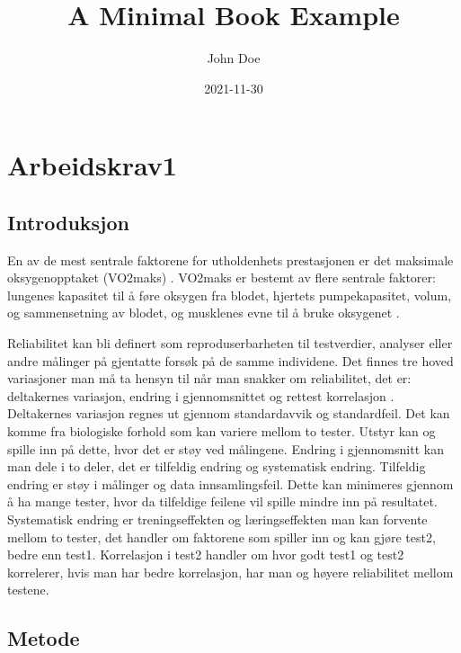 \documentclass[
]{book}
\title{A Minimal Book Example}
\author{John Doe}
\date{2021-11-30}
\begin{document}
\maketitle

{
\setcounter{tocdepth}{1}
\tableofcontents
}
\hypertarget{arbeidskrav1}{%
\chapter{Arbeidskrav1}\label{arbeidskrav1}}

\hypertarget{introduksjon}{%
\section{Introduksjon}\label{introduksjon}}

En av de mest sentrale faktorene for utholdenhets prestasjonen er det maksimale oksygenopptaket (VO2maks) \citet{bassett2000} . VO2maks er bestemt av flere sentrale faktorer: lungenes kapasitet til å føre oksygen fra blodet, hjertets pumpekapasitet, volum, og sammensetning av blodet, og musklenes evne til å bruke oksygenet \citet{bassett2000} .

Reliabilitet kan bli definert som reproduserbarheten til testverdier, analyser eller andre målinger på gjentatte forsøk på de samme individene. Det finnes tre hoved variasjoner man må ta hensyn til når man snakker om reliabilitet, det er: deltakernes variasjon, endring i gjennomsnittet og rettest korrelasjon \citet{hopkins2000}. Deltakernes variasjon regnes ut gjennom standardavvik og standardfeil. Det kan komme fra biologiske forhold som kan variere mellom to tester. Utstyr kan og spille inn på dette, hvor det er støy ved målingene. Endring i gjennomsnitt kan man dele i to deler, det er tilfeldig endring og systematisk endring. Tilfeldig endring er støy i målinger og data innsamlingsfeil. Dette kan minimeres gjennom å ha mange tester, hvor da tilfeldige feilene vil spille mindre inn på resultatet. Systematisk endring er treningseffekten og læringseffekten man kan forvente mellom to tester, det handler om faktorene som spiller inn og kan gjøre test2, bedre enn test1. Korrelasjon i test2 handler om hvor godt test1 og test2 korrelerer, hvis man har bedre korrelasjon, har man og høyere reliabilitet mellom testene.

\hypertarget{metode}{%
\section{Metode}\label{metode}}
\end{document}
